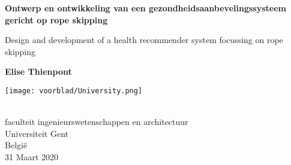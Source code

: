 \begin{titlepage}
    \begin{center}
        \vspace*{1cm}
            
        \Huge
        \textbf{ Ontwerp en ontwikkeling van een gezondheidsaanbevelingssysteem gericht op rope skipping}
            
        \vspace{0.5cm}
        \LARGE
        Design and development of a health recommender system focussing on rope skipping
    
            
        \vspace{1.5cm}
            
        \textbf{Elise Thienpont}
            
        \vfill
            

            
        \vspace{0.8cm}
            
        \texttt{[image: voorblad/University.png]}
            
        \Large
        \\faculteit ingenieurswetenschappen en architectuur
        \\Universiteit Gent
        \\België
        \\31 Maart 2020
            
    \end{center}
\end{titlepage}